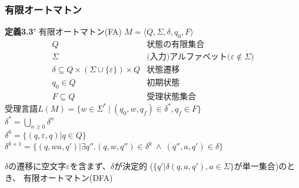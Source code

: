 \documentclass[ckj,dvipdfmx]{beamer}
\begin{document}
\begin{frame}
 \frametitle{有限オートマトン}
 \begin{screen}
  {\bf 定義3.3'} 有限オートマトン(FA)
	$M=\langle Q,\Sigma,\delta,q_0,F\rangle$
	\[
	\begin{array}{rl}
	 Q & \mbox{状態の有限集合}\\
	 \Sigma & \mbox{(入力)アルファベット($\varepsilon\notin\Sigma$)}\\
	 \delta\subseteq Q\times(\Sigma\cup\{\varepsilon\})\times Q & \mbox{状態遷移}\\
	 q_0\in Q & \mbox{初期状態}\\
	 F\subseteq Q & \mbox{受理状態集合}
	\end{array}
	\]
	受理言語$L(M)=\{w\in\Sigma^\ast\ |\ (q_0,w,q_f)\in\delta^\ast,
	q_f\in F\}$\\
	$\delta^\ast=\bigcup_{n\geq 0}\delta^n$\\
	$\delta^0=\{(q,\varepsilon,q)|q\in Q\}$\\
	$\delta^{k+1}=\{(q,wa,q')|\exists q''.(q,w,q'')\in\delta^k\
	\wedge\ (q'',a,q')\in\delta\}$
 \end{screen}
 
 $\delta$の遷移に空文字$\varepsilon$を含まず、$\delta$が決定的
 ($\{q'|\delta(q,a,q'),a\in\Sigma\}$が単一集合)のとき、
 有限オートマトン(DFA)
\end{frame}
\end{document}
